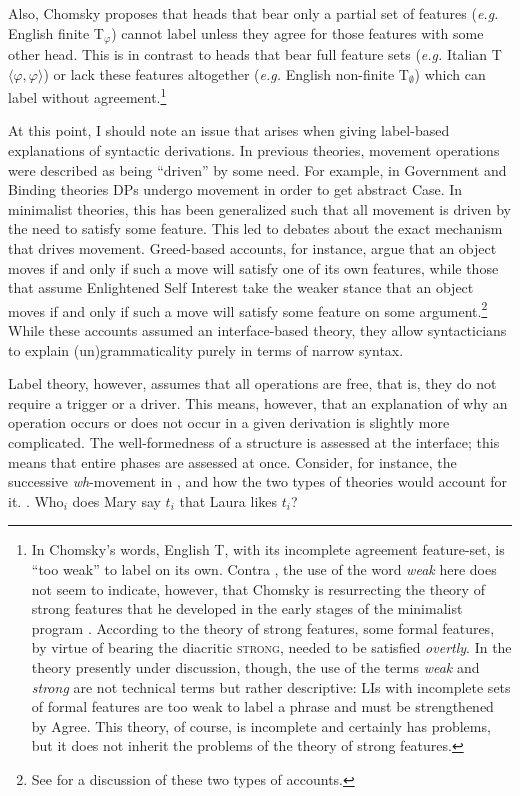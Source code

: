 \documentclass[MilwayThesis]{subfiles}
\begin{document}
Also, Chomsky proposes that heads that bear only a partial set of features (\textit{e.g.} English finite T$_\varphi$) cannot label unless they agree for those features with some other head.
This is in contrast to heads that bear full feature sets (\textit{e.g.} Italian T${\langle\varphi,\varphi\rangle}$) or lack these features altogether (\textit{e.g.} English non-finite T$_\emptyset$) which can label without agreement.\footnote{
	In Chomsky's words, English T, with its incomplete agreement feature-set, is ``too weak'' to label on its own. 
	Contra \textcite{gallego2017remark}, the use of the word \textit{weak} here does not seem to indicate, however, that Chomsky is resurrecting the theory of strong features that he developed in the early stages of the minimalist program \parencite{chomsky1995minimalist,chomsky2000minimalist}.
	According to the theory of strong features, some formal features, by virtue of bearing the diacritic \textsc{strong}, needed to be satisfied \textit{overtly}.
	In the theory presently under discussion, though, the use of the terms \textit{weak} and \textit{strong} are not technical terms but rather descriptive: 
	LIs with incomplete sets of formal features are too weak to label a phrase and must be strengthened by Agree.
	This theory, of course, is incomplete and certainly has problems, but it does not inherit the problems of the theory of strong features.
}

At this point, I should note an issue that arises when giving label-based explanations of syntactic derivations.
In previous theories, movement operations were described as being ``driven'' by some need.
For example, in Government and Binding theories DPs undergo movement in order to get abstract Case.
In minimalist theories, this has been generalized such that all movement is driven by the need to satisfy some feature.
This led to debates about the exact mechanism that drives movement. 
Greed-based accounts, for instance, argue that an object moves if and only if such a move will satisfy one of its own features, while those that assume Enlightened Self Interest take the weaker stance that an object moves if and only if such a move will satisfy some feature on some argument.\footnote{
	See \textcite{lasnik1999last} for a discussion of these two types of accounts.
}
While these accounts assumed an interface-based theory, they allow syntacticians to explain (un)grammaticality purely in terms of narrow syntax.

Label theory, however, assumes that all operations are free, that is, they do not require a trigger or a driver.
This means, however, that an explanation of why an operation occurs or does not occur in a given derivation is slightly more complicated.
The well-formedness of a structure is assessed at the interface; this means that entire phases are assessed at once.
Consider, for instance, the successive \textit{wh}-movement in \Next, and how the two types of theories would account for it.
\ex. Who$_i$ does Mary say $t_i$ that Laura likes $t_i$?
\end{document}
